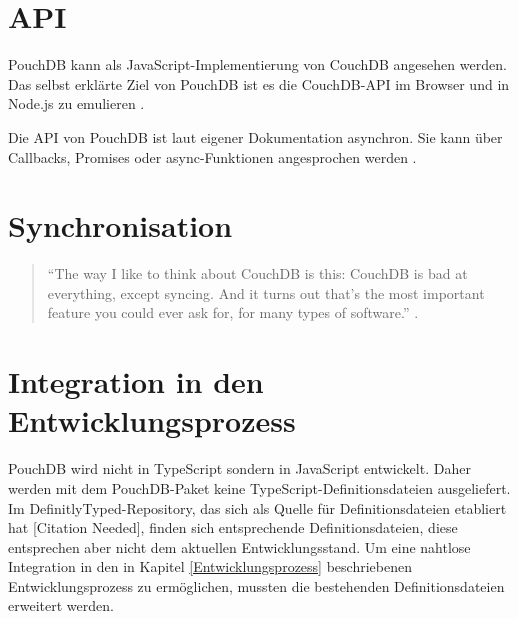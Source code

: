\section{API}
\label{API}
PouchDB kann als JavaScript-Implementierung von CouchDB angesehen werden. Das selbst erklärte Ziel von PouchDB ist es die CouchDB-API im Browser und in Node.js zu emulieren \cite{pouch:intro}. 

Die API von PouchDB ist laut eigener Dokumentation asynchron. Sie kann über Callbacks, Promises oder async-Funktionen angesprochen werden \cite{pouch:api}.


\section{Synchronisation}
\label{Synchronisation}

\begin{citeenv}
\begin{quotation}
"`The way I like to think about CouchDB is this: CouchDB is bad at everything, except syncing. And it turns out that's the most important feature you could ever ask for, for many types of software."' \cite{pouch:replication}.
\end{quotation}
\end{citeenv}

\section{Integration in den Entwicklungsprozess}

PouchDB wird nicht in TypeScript sondern in JavaScript entwickelt. Daher werden mit dem PouchDB-Paket keine TypeScript-Definitionsdateien ausgeliefert. Im DefinitlyTyped-Repository, das sich als Quelle für Definitionsdateien etabliert hat [Citation Needed], finden sich entsprechende Definitionsdateien, diese entsprechen aber nicht dem aktuellen Entwicklungsstand. Um eine nahtlose Integration in den in Kapitel \ref{Entwicklungsprozess} beschriebenen Entwicklungsprozess zu ermöglichen, mussten die bestehenden Definitionsdateien erweitert werden. 